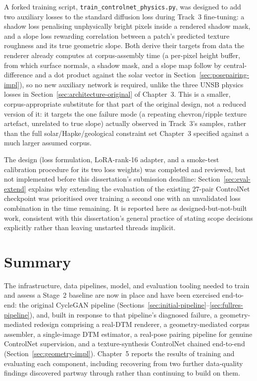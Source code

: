 A forked training script, \texttt{train\_controlnet\_physics.py}, was designed to add two auxiliary losses to the standard diffusion loss during Track~3 fine-tuning: a shadow loss penalising unphysically bright pixels inside a rendered shadow mask, and a slope loss rewarding correlation between a patch's predicted texture roughness and its true geometric slope. Both derive their targets from data the renderer already computes at corpus-assembly time (a per-pixel height buffer, from which surface normals, a shadow mask, and a slope map follow by central-difference and a dot product against the solar vector in Section~\ref{sec:posepairing-impl}), so no new auxiliary network is required, unlike the three UNSB physics losses in Section~\ref{sec:architecture-original} of Chapter~3. This is a smaller, corpus-appropriate substitute for that part of the original design, not a reduced version of it: it targets the one failure mode (a repeating chevron/ripple texture artefact, unrelated to true slope) actually observed in Track~3's samples, rather than the full solar/Hapke/geological constraint set Chapter~3 specified against a much larger assumed corpus.

The design (loss formulation, LoRA-rank-16 adapter, and a smoke-test calibration procedure for its two loss weights) was completed and reviewed, but not implemented before this dissertation's submission deadline: Section~\ref{sec:eval-extend} explains why extending the evaluation of the existing 27-pair ControlNet checkpoint was prioritised over training a second one with an unvalidated loss combination in the time remaining. It is reported here as designed-but-not-built work, consistent with this dissertation's general practice of stating scope decisions explicitly rather than leaving unstarted threads implicit.

\section{Summary}

The infrastructure, data pipelines, model, and evaluation tooling needed to train and assess a Stage~2 baseline are now in place and have been exercised end-to-end: the original CycleGAN pipeline (Sections~\ref{sec:initial-pipeline}--\ref{sec:fullres-pipeline}), and, built in response to that pipeline's diagnosed failure, a geometry-mediated redesign comprising a real-DTM renderer, a geometry-mediated corpus assembler, a single-image DTM estimator, a real-pose pairing pipeline for genuine ControlNet supervision, and a texture-synthesis ControlNet chained end-to-end (Section~\ref{sec:geometry-impl}). Chapter~5 reports the results of training and evaluating each component, including recovering from two further data-quality findings discovered partway through rather than continuing to build on them.
